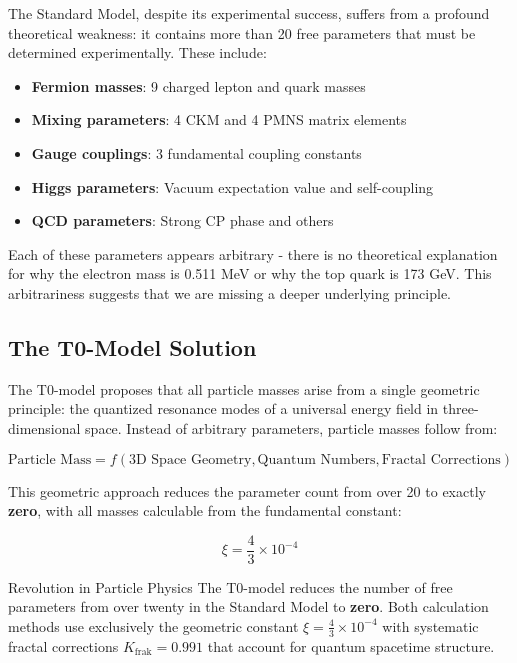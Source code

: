 \documentclass[12pt,a4paper]{article}
\newcommand{\xipar}{\xi}
\begin{document}
	The Standard Model, despite its experimental success, suffers from a profound theoretical weakness: it contains more than 20 free parameters that must be determined experimentally. These include:
	
	\begin{itemize}
		\item \textbf{Fermion masses}: 9 charged lepton and quark masses
		\item \textbf{Mixing parameters}: 4 CKM and 4 PMNS matrix elements
		\item \textbf{Gauge couplings}: 3 fundamental coupling constants
		\item \textbf{Higgs parameters}: Vacuum expectation value and self-coupling
		\item \textbf{QCD parameters}: Strong CP phase and others
	\end{itemize}
	
	Each of these parameters appears arbitrary - there is no theoretical explanation for why the electron mass is 0.511 MeV or why the top quark is 173 GeV. This arbitrariness suggests that we are missing a deeper underlying principle.
	
	\subsection{The T0-Model Solution}
	\label{subsec:t0_solution}
	
	The T0-model proposes that all particle masses arise from a single geometric principle: the quantized resonance modes of a universal energy field in three-dimensional space. Instead of arbitrary parameters, particle masses follow from:
	
	\begin{equation}
		\text{Particle Mass} = f(\text{3D Space Geometry}, \text{Quantum Numbers}, \text{Fractal Corrections})
		\label{eq:t0_principle}
	\end{equation}
	
	This geometric approach reduces the parameter count from over 20 to exactly \textbf{zero}, with all masses calculable from the fundamental constant:
	
	\begin{equation}
		\xi = \frac{4}{3} \times 10^{-4}
		\label{eq:fundamental_constant}
	\end{equation}
	
	\begin{important}{Revolution in Particle Physics}{}
		The T0-model reduces the number of free parameters from over twenty in the Standard Model to \textbf{zero}. Both calculation methods use exclusively the geometric constant $\xipar = \frac{4}{3} \times 10^{-4}$ with systematic fractal corrections $K_{\text{frak}} = 0.991$ that account for quantum spacetime structure.
	\end{important}
	
\end{document}
